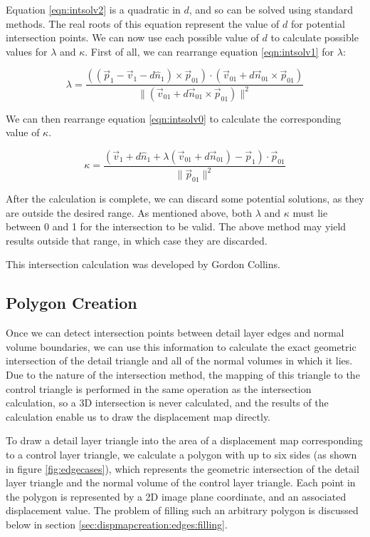 Equation \ref{eqn:intsolv2} is a quadratic in $d$, and so can be solved using standard methods. The real roots of this equation represent the value of $d$ for potential intersection points. We can now use each possible value of $d$ to calculate possible values for $\lambda$ and $\kappa$. First of all, we can rearrange equation \ref{eqn:intsolv1} for $\lambda$:

\begin{equation} \label{eqn:lambda}
\lambda = \frac{((\vec{p}_1 - \vec{v}_1 - d\hat{n}_1) \times \vec{p}_{01}) \cdot (\vec{v}_{01}+d\vec{n}_{01} \times \vec{p}_{01})}{\|(\vec{v}_{01}+d\vec{n}_{01} \times \vec{p}_{01})\|^2}
\end{equation}

We can then rearrange equation \ref{eqn:intsolv0} to calculate the corresponding value of $\kappa$.

\begin{equation} \label{eqn:kappa}
\kappa = \frac{(\vec{v}_1 + d\hat{n}_1 + \lambda(\vec{v}_{01}+d\vec{n}_{01}) - \vec{p}_1) \cdot \vec{p}_{01}}{\|\vec{p}_{01}\|^2}
\end{equation}

After the calculation is complete, we can discard some potential solutions, as they are outside the desired range. As mentioned above, both $\lambda$ and $\kappa$ must lie between 0 and 1 for the intersection to be valid. The above method may yield results outside that range, in which case they are discarded.

This intersection calculation was developed by Gordon Collins.

\subsection{\label{sec:dispmapcreation:edges:polygon}Polygon Creation}

Once we can detect intersection points between detail layer edges and normal volume boundaries, we can use this information to calculate the exact geometric intersection of the detail triangle and all of the normal volumes in which it lies. Due to the nature of the intersection method, the mapping of this triangle to the control triangle is performed in the same operation as the intersection calculation, so a 3D intersection is never calculated, and the results of the calculation enable us to draw the displacement map directly.

To draw a detail layer triangle into the area of a displacement map  corresponding to a control layer triangle, we calculate a polygon with up to six sides (as shown in figure \ref{fig:edgecases}), which represents the geometric intersection of the detail layer triangle and the normal volume of the control layer triangle. Each point in the polygon is represented by a 2D image plane coordinate, and an associated displacement value. The problem of filling such an arbitrary polygon is discussed below in section \ref{sec:dispmapcreation:edges:filling}.

